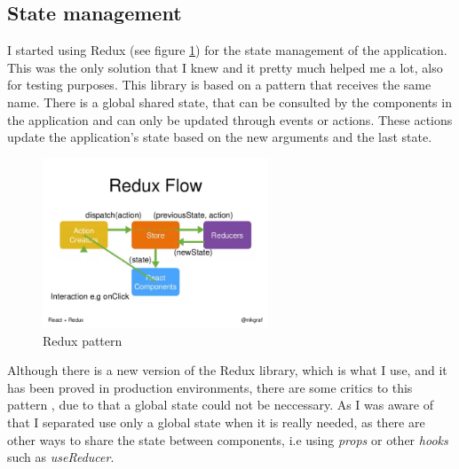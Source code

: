     \subsection{State management}
        I started using Redux \cite{Redux} (see figure \ref{fig:Redux pattern}) for the state management of the application. This was the only solution that I knew and it pretty much helped me a lot, also for testing purposes. 
        This library is based on a pattern that receives the same name. 
        There is a global shared state, that can be consulted by the components in the application and can only be updated through 
        events or actions. These actions update the application's state based on the new arguments and the last state. 
        \begin{figure}[H]
            \centering
                \includegraphics[width=0.6\textwidth]{assets/diagrams/redux.png}
            \caption{Redux pattern}
            \label{fig:Redux pattern}
        \end{figure}

        Although there is a new version of the Redux library, which is what I use, and it has been proved in production environments, 
        there are some critics to this pattern \cite{NoRedux}, due to that a global state could not be neccessary. 
        As I was aware of that I separated use only a global state when it is really needed, as 
        there are other ways to share the state between components, i.e using \textit{props} or other \textit{hooks} such as \textit{useReducer}. 

